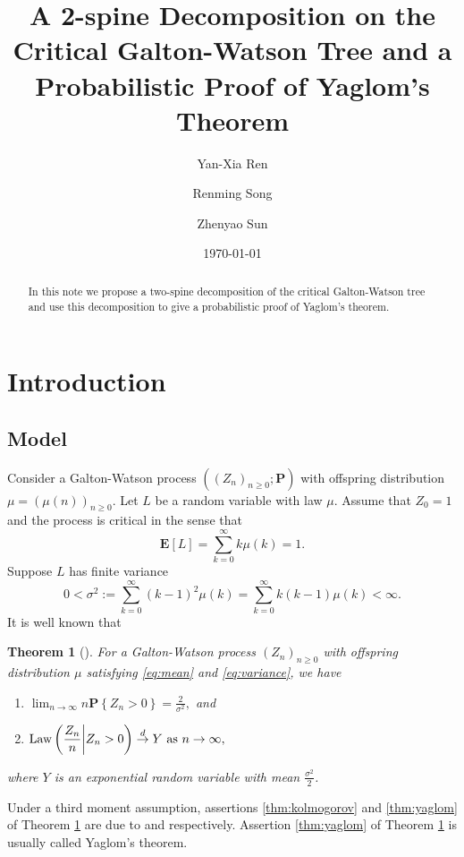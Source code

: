\documentclass[12pt]{amsart}
\title[A 2-spine decomposition and Yaglom's theorem]{\large A 2-spine Decomposition on the Critical Galton-Watson Tree and a Probabilistic Proof of Yaglom's Theorem}
\author{Yan-Xia Ren}
\author{Renming Song}
\author{Zhenyao Sun}
\date{\today}
\newtheorem{thm}{Theorem}[section]
\numberwithin{equation}{section}
\newcommand{\expr}[1]{\left( #1 \right)}
\newcommand{\set}[1]{\left\{ #1 \right\}}
\newcommand{\law}{\text{\rm Law}}
\newcommand{\tolaw}{\stackrel{d}{\to}}
\newcommand{\expct}{\mathbf E}
\newcommand{\bP}{\mathbf P}\newcommand{\bbP}{\mathbb P}\newcommand{\cP}{\mathcal P}
\begin{document}
\begin{abstract}
	In this note  we propose a two-spine decomposition of the critical
		Galton-Watson
	tree and use this decomposition to give a probabilistic proof of Yaglom's theorem.
\end{abstract}
	\maketitle	
\section{Introduction}
\subsection{Model}
\label{sec:model}
	Consider a Galton-Watson process $((Z_n)_{n\ge0}; \bP )$ with offspring distribution $\mu=(\mu(n))_{n\ge 0}$.
	Let $L$ be a random variable with law $\mu$. Assume that $Z_0=1$ and the process is critical in the sense that
\begin{equation}
\label{eq:mean}
		\expct [L]
	=
		\sum_{k=0}^\infty k \mu(k)
	=
		1.
\end{equation}
	Suppose $L$ has finite variance
\begin{equation}
\label{eq:variance}
		0	
	<	
		\sigma^2
	:=
		\sum_{k=0}^\infty  (k-1)^2 \mu(k)
	=
		\sum_{k=0}^\infty k(k-1) \mu(k)
	<
		\infty.
\end{equation}
	It is well known that
\begin{thm}[\cite{kesten1966galton}]
\label{thm:kesten}
	For a Galton-Watson process $(Z_n)_{n\ge 0}$ with offspring distribution $\mu$ satisfying \eqref{eq:mean} and \eqref{eq:variance}, we have
\begin{enumerate}
\item
\label{thm:kolmogorov}
	$\displaystyle \lim_{n \to \infty} n \bP \set{Z_n>0} = \frac{2}{\sigma^2},$ and
\item
\label{thm:yaglom}
	$\displaystyle	\law\expr{\frac{Z_n}{n}\bigg| Z_n>0}\tolaw Y \ \text{as }n\to\infty,$
\end{enumerate}
	where $Y$ is an exponential random variable with mean $\frac{\sigma^2}{2}$.
\end{thm}
\par
	Under a third moment assumption, assertions \eqref{thm:kolmogorov} and \eqref{thm:yaglom} of Theorem \ref{thm:kesten} are due to \cite{kolmogorov1938losung} and \cite{yaglom1947certain} respectively.
	Assertion \eqref{thm:yaglom} of Theorem \ref{thm:kesten} is usually called Yaglom's theorem.
\end{document}
